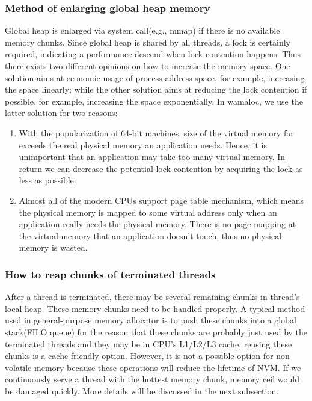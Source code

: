 \documentclass[10pt, conference, compsocconf]{IEEEtran}
\begin{document}
\subsubsection{Method of enlarging global heap memory}
Global heap is enlarged via system call(e.g., mmap) if there is no available memory chunks.
Since global heap is shared by all threads, 
a lock is certainly required, indicating a performance descend when lock contention happens.
Thus there exists two different opinions on how to increase the memory space. 
One solution aims at economic usage of process address space, for example, increasing the space linearly;
while the other solution aims at reducing the lock contention if possible, for example, increasing the space exponentially. 
In wamaloc, we use the latter solution for two reasons: 
\begin{enumerate}
    \item With the popularization of 64-bit machines, size of the virtual memory far exceeds the real physical memory an application needs.
Hence, it is unimportant that an application may take too many virtual memory. 
In return we can decrease the potential lock contention by acquiring the lock as less as possible.
    \item Almost all of the modern CPUs support page table mechanism, 
        which means the physical memory is mapped to some virtual address only when an application really needs the physical memory. 
        There is no page mapping at the virtual memory that an application doesn't touch, thus no physical memory is wasted.
\end{enumerate}

\subsubsection{How to reap chunks of terminated threads}
After a thread is terminated, there may be several remaining chunks in thread's local heap. 
These memory chunks need to be handled properly.
A typical method used in general-purpose memory allocator is to push these chunks into a global stack(FILO queue)
for the reason that these chunks are probably just used by the terminated threads and they may be in CPU's L1/L2/L3 cache, 
reusing these chunks is a cache-friendly option.
However, it is not a possible option for non-volatile memory because these operations will reduce the lifetime of NVM.
If we continuously serve a thread with the hottest memory chunk, memory ceil would be damaged quickly.
More details will be discussed in the next subsection.
\end{document}
